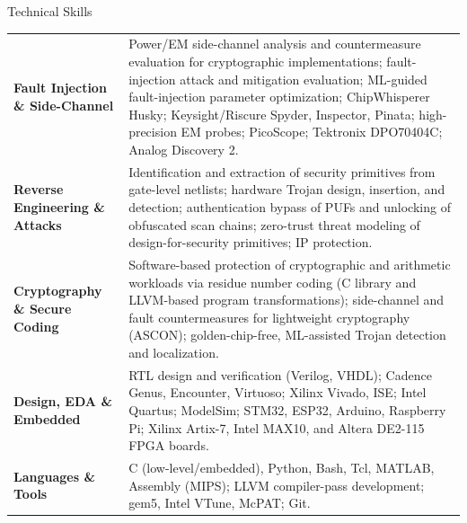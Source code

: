 \begin{rSection}{Technical Skills}

\begin{tabularx}{\textwidth}{@{}>{\leavevmode\color{accent}\bfseries}p{5.1cm} X@{}}
    Fault Injection \& Side-Channel & Power/EM side-channel analysis and countermeasure evaluation for cryptographic implementations; fault-injection attack and mitigation evaluation; ML-guided fault-injection parameter optimization; ChipWhisperer Husky; Keysight/Riscure Spyder, Inspector, Pinata; high-precision EM probes; PicoScope; Tektronix DPO70404C; Analog Discovery 2.\\[0.15em]
    Reverse Engineering \& Attacks & Identification and extraction of security primitives from gate-level netlists; hardware Trojan design, insertion, and detection; authentication bypass of PUFs and unlocking of obfuscated scan chains; zero-trust threat modeling of design-for-security primitives; IP protection.\\[0.15em]
    Cryptography \& Secure Coding & Software-based protection of cryptographic and arithmetic workloads via residue number coding (C library and LLVM-based program transformations); side-channel and fault countermeasures for lightweight cryptography (ASCON); golden-chip-free, ML-assisted Trojan detection and localization.\\[0.15em]
    Design, EDA \& Embedded & RTL design and verification (Verilog, VHDL); Cadence Genus, Encounter, Virtuoso; Xilinx Vivado, ISE; Intel Quartus; ModelSim; STM32, ESP32, Arduino, Raspberry Pi; Xilinx Artix-7, Intel MAX10, and Altera DE2-115 FPGA boards.\\[0.15em]
    Languages \& Tools & C (low-level/embedded), Python, Bash, Tcl, MATLAB, Assembly (MIPS); LLVM compiler-pass development; gem5, Intel VTune, McPAT; Git.\\
\end{tabularx}

\end{rSection}
